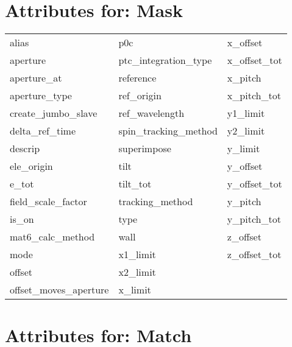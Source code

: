  \section{Attributes for: Mask}
 \label{s:list.mask}
 
 \begin{tabular}{lll} \toprule
alias                       & p0c                         & x_offset                    \\
aperture                    & ptc_integration_type        & x_offset_tot                \\
aperture_at                 & reference                   & x_pitch                     \\
aperture_type               & ref_origin                  & x_pitch_tot                 \\
create_jumbo_slave          & ref_wavelength              & y1_limit                    \\
delta_ref_time              & spin_tracking_method        & y2_limit                    \\
descrip                     & superimpose                 & y_limit                     \\
ele_origin                  & tilt                        & y_offset                    \\
e_tot                       & tilt_tot                    & y_offset_tot                \\
field_scale_factor          & tracking_method             & y_pitch                     \\
is_on                       & type                        & y_pitch_tot                 \\
mat6_calc_method            & wall                        & z_offset                    \\
mode                        & x1_limit                    & z_offset_tot                \\
offset                      & x2_limit                    &                             \\
offset_moves_aperture       & x_limit                     &                             \\
 \bottomrule
 \end{tabular}
 \vfill
 
 \section{Attributes for: Match}
 \label{s:list.match}
 
